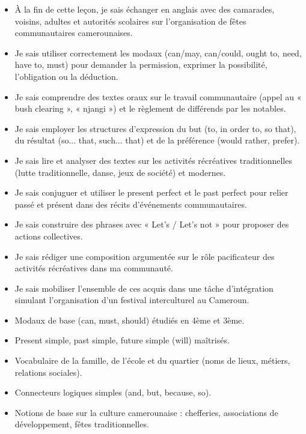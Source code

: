 \documentclass[11pt]{article}
\begin{document}
\begin{objectifs}
\begin{itemize}
\item À la fin de cette leçon, je sais échanger en anglais avec des camarades, voisins, adultes et autorités scolaires sur l'organisation de fêtes communautaires camerounaises.
\item Je sais utiliser correctement les modaux (can/may, can/could, ought to, need, have to, must) pour demander la permission, exprimer la possibilité, l'obligation ou la déduction.
\item Je sais comprendre des textes oraux sur le travail communautaire (appel au « bush clearing », « njangi ») et le règlement de différends par les notables.
\item Je sais employer les structures d'expression du but (to, in order to, so that), du résultat (so... that, such... that) et de la préférence (would rather, prefer).
\item Je sais lire et analyser des textes sur les activités récréatives traditionnelles (lutte traditionnelle, danse, jeux de société) et modernes.
\item Je sais conjuguer et utiliser le present perfect et le past perfect pour relier passé et présent dans des récits d'événements communautaires.
\item Je sais construire des phrases avec « Let's / Let's not » pour proposer des actions collectives.
\item Je sais rédiger une composition argumentée sur le rôle pacificateur des activités récréatives dans ma communauté.
\item Je sais mobiliser l'ensemble de ces acquis dans une tâche d'intégration simulant l'organisation d'un festival interculturel au Cameroun.
\end{itemize}
\end{objectifs}

\begin{prerequis}
\begin{itemize}
\item Modaux de base (can, must, should) étudiés en 4ème et 3ème.
\item Present simple, past simple, future simple (will) maîtrisés.
\item Vocabulaire de la famille, de l'école et du quartier (noms de lieux, métiers, relations sociales).
\item Connecteurs logiques simples (and, but, because, so).
\item Notions de base sur la culture camerounaise : chefferies, associations de développement, fêtes traditionnelles.
\end{itemize}
\end{prerequis}
\end{document}
